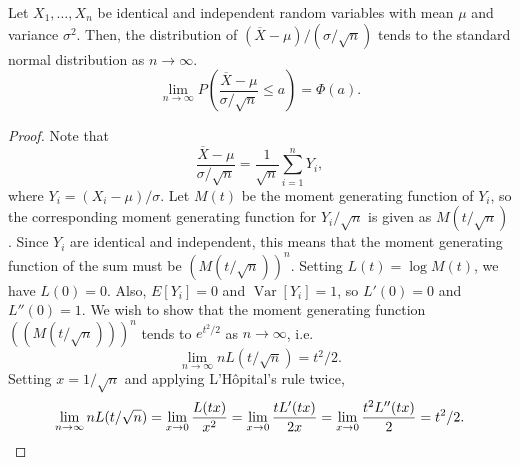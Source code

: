 \documentclass[11pt]{article}
\newcommand\E[1]{E\left[#1\right]}
\newcommand\var[1]{\operatorname{Var}[#1]}
\theoremstyle{definition}
\theoremstyle{remark}
\numberwithin{equation}{module}
\begin{document}
    \begin{theorem}
        Let $X_1, \dots, X_n$ be identical and independent random variables with
        mean $\mu$ and variance $\sigma^2$. Then, the distribution of $(\overline{X}
        - \mu)/ (\sigma / \sqrt{n})$ tends to the standard normal distribution as $n
        \to \infty$. \[
            \lim_{n \to \infty} P\left(\frac{\overline{X} - \mu}{\sigma / \sqrt{n}}
            \leq a  \right) = \Phi(a).
        \] 
    \end{theorem}
    \begin{proof}
        Note that \[
            \frac{\overline{X} - \mu}{\sigma / \sqrt{n}} = \frac{1}{\sqrt{n}}\sum_{i
            = 1}^n Y_i,
        \] where $Y_i = (X_i - \mu) / \sigma$. Let $M(t)$ be the moment generating
        function of $Y_i$, so the corresponding moment generating function for $Y_i
        / \sqrt{n}$ is given as $M(t / \sqrt{n})$. Since $Y_i$ are identical and
        independent, this means that the moment generating function of the sum must
        be $(M(t / \sqrt{n}))^n$. Setting $L(t) = \log M(t)$, we have $L(0) = 0$.
        Also, $\E{Y_i} = 0$ and $\var{Y_i} = 1$, so $L'(0) = 0$ and $L''(0) = 1$.
        We wish to show that the moment generating function $((M(t / \sqrt{n})))^n$
        tends to $e^{t^2 / 2}$ as $n \to \infty$, i.e.\ \[
            \lim_{n \to \infty} nL(t / \sqrt{n}) = t^2 / 2.
        \] Setting $x = 1 / \sqrt{n}$ and applying L'H\^opital's rule twice, \[
            \lim_{n \to \infty} nL(t / \sqrt{n}) = \lim_{x \to 0}
            \frac{L(tx)}{x^2} = \lim_{x \to 0} \frac{t L'(tx)}{2x} = \lim_{x \to 0}
            \frac{t^2 L''(tx)}{2} = t^2 /2. \qedhere
        \] 
    \end{proof}
\end{document}
